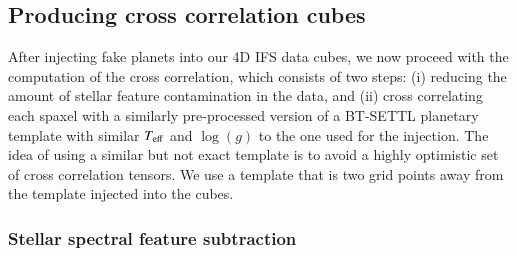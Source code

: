 \documentclass{aa}
\begin{document}
\subsection{Producing cross correlation cubes}\label{sec:specpreproc}

After injecting fake planets into our 4D IFS data cubes, we now proceed with the computation of the cross correlation, which consists of two steps: (i) reducing the amount of stellar feature contamination in the data, and (ii) cross correlating each spaxel with a similarly pre-processed version of a BT-SETTL planetary template with similar $T_{\rm eff}$ and $\log(g)$ to the one used for the injection.
The idea of using a similar but not exact template is to avoid a highly optimistic set of cross correlation tensors.
We use a template that is two grid points away from the template injected into the cubes.

\subsubsection{Stellar spectral feature subtraction}
\end{document}
